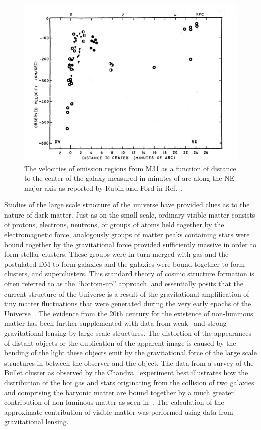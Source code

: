 \begin{figure}
  \centering
  \includegraphics[width=\textwidth]{figs/RubinFordVel}
  \caption{The velocities of emission regions from M31 as a function of distance to the center of the galaxy measured in minutes of arc along the NE major axis as reported by Rubin and Ford in Ref.~\cite{Rubin:1970zza}.}
\label{fig:rubin}
\end{figure}

Studies of the large scale structure of the universe have provided clues as to the nature of dark matter. Just as on the small scale, ordinary visible matter consists of protons, electrons, neutrons, or groups of atoms held together by the electromagnetic force, analogously groups of matter peaks containing stars were bound together by the gravitational force provided sufficiently massive in order to form stellar clusters. These groups were in turn merged with gas and the postulated DM to form galaxies and the galaxies were bound together to form clusters, and superclusters. This standard theory of cosmic structure formation is often referred to as the ``bottom-up'' approach, and essentially posits that the current structure of the Universe is a result of the gravitational amplification of tiny matter fluctuations that were generated during the very early epochs of the Universe~\cite{Allen:2002eu}. The evidence from the 20th century for the existence of non-luminous matter has been further supplemented with data from weak~\cite{Refregier:2003ct} and strong~\cite{Tyson:1998vp} gravitational lensing by large scale structures. The distortion of the appearances of distant objects or the duplication of the apparent image is caused by the bending of the light these objects emit by the gravitational force of the large scale structures in between the observer and the object. The data from a survey of the Bullet cluster as observed by the Chandra~\cite{Markevitch:2005vi} experiment best illustrates how the distribution of the hot gas and stars originating from the collision of two galaxies and comprising the baryonic matter are bound together by a much greater contribution of non-luminous matter as seen in~. The calculation of the approximate contribution of visible matter was performed using data from gravitational lensing.

